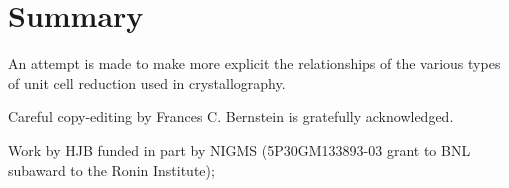 \documentclass[preprint]{iucr}              %
\numberwithin{equation}{section}
\begin{document}
	
	
	
	
	\section{Summary}
	
	An attempt is made to make more explicit the relationships of the various
	types of unit cell reduction used in crystallography.
	
	
	
	
	Careful copy-editing by Frances C. Bernstein is gratefully acknowledged.
	
	Work by HJB funded in part by NIGMS (5P30GM133893-03 grant to BNL subaward to the Ronin Institute); 
	
	
	
	
	
	
	
	
	
	
	
	
	
	
	
\end{document}
